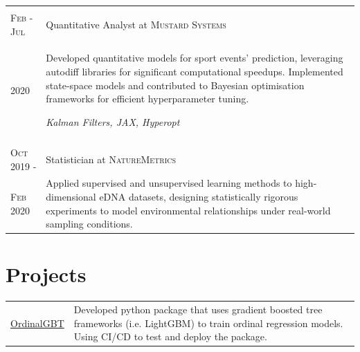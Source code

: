 \documentclass[a4paper,11pt]{article}
\begin{document}
\begin{tabular}{>{\raggedleft\arraybackslash}p{2cm}|p{12.9cm}}
\\\multicolumn{2}{c}{} \\
 \textsc{Feb - Jul}& Quantitative Analyst at \textsc{Mustard Systems} \\
\textsc{2020} &
 \footnotesize{
 \vspace*{-\baselineskip}

 Developed quantitative models for sport events' prediction, leveraging autodiff libraries for significant computational speedups. Implemented state-space models and contributed to Bayesian optimisation frameworks for efficient hyperparameter tuning.

 
\textit{Kalman Filters, JAX, Hyperopt}

}

\\\multicolumn{2}{c}{} \\
 \textsc{Oct 2019 -} & Statistician at \textsc{NatureMetrics} \\
 \textsc{Feb 2020}&
 \footnotesize{
 
 \vspace*{-\baselineskip}
Applied supervised and unsupervised learning methods to high-dimensional eDNA datasets, designing statistically rigorous experiments to model environmental relationships under real-world sampling conditions.

  
}
\end{tabular}

\section{Projects}
\begin{tabular}{ >{\raggedleft\arraybackslash}p{2cm}| p{12.9cm}}
\href{https://github.com/adamingas/ordinalgbt/}{OrdinalGBT} & \footnotesize{Developed  python package that uses gradient boosted tree frameworks (i.e. LightGBM) to train ordinal regression models. Using CI/CD to test and deploy the package.}
\end{tabular}
\end{document}
